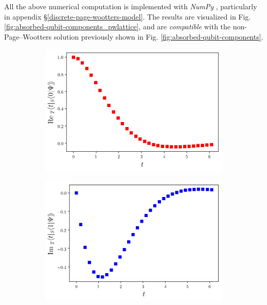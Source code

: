 All the above numerical computation is implemented with \emph{NumPy} \parencite{comp:numpy},
particularly in appendix
\S \ref{discrete-page-wootters-model}.
The results are visualized in
Fig. \ref{fig:absorbed-qubit-components_pwlattice},
and are \emph{compatible} with the non-Page--Wootters
solution previously shown in Fig. \ref{fig:absorbed-qubit-components}.

\begin{figure}
  \centering
  \begin{subfigure}[b]{0.49\textwidth}
    \includegraphics[width=\linewidth]{img/2ldetect/re_psi0_t_pwlattice.png}
    \subcaption{}\label{fig:absorbed-qubit-components_pwlattice:re0}
  \end{subfigure}
  \begin{subfigure}[b]{0.49\textwidth}
    \includegraphics[width=\linewidth]{img/2ldetect/im_psi1_t_pwlattice.png}

\end{subfigure}
\end{figure}
